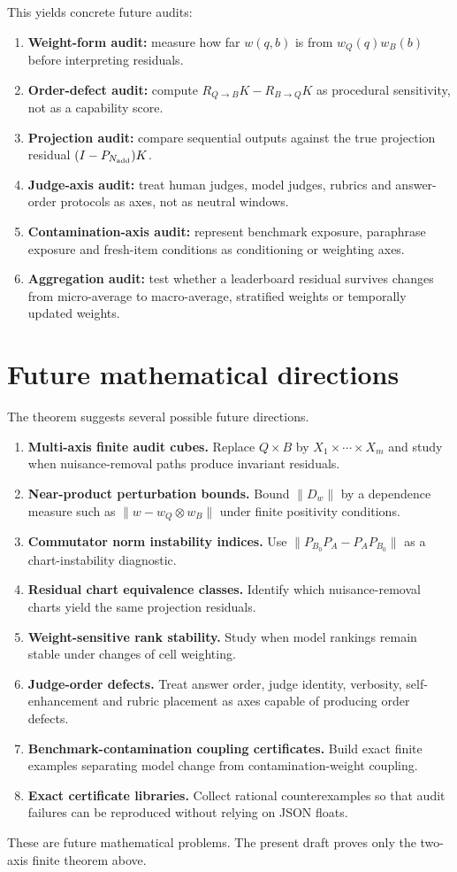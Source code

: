 \documentclass[11pt]{article}
\theoremstyle{remark}
\newcommand{\RQBt}{R_{Q\to B}}
\newcommand{\RBQt}{R_{B\to Q}}
\begin{document}
This yields concrete future audits:
\begin{enumerate}[leftmargin=*,itemsep=2pt]
\item \textbf{Weight-form audit:} measure how far $w(q,b)$ is from $w_Q(q)w_B(b)$ before interpreting residuals.
\item \textbf{Order-defect audit:} compute $\RQBt K-\RBQt K$ as procedural sensitivity, not as a capability score.
\item \textbf{Projection audit:} compare sequential outputs against the true projection residual $(I-P_{N_{\rm add}})K$.
\item \textbf{Judge-axis audit:} treat human judges, model judges, rubrics and answer-order protocols as axes, not as neutral windows.
\item \textbf{Contamination-axis audit:} represent benchmark exposure, paraphrase exposure and fresh-item conditions as conditioning or weighting axes.
\item \textbf{Aggregation audit:} test whether a leaderboard residual survives changes from micro-average to macro-average, stratified weights or temporally updated weights.
\end{enumerate}

\section{Future mathematical directions}

The theorem suggests several possible future directions.
\begin{enumerate}[leftmargin=*,itemsep=2pt]
\item \textbf{Multi-axis finite audit cubes.} Replace $Q\times B$ by $X_1\times\cdots\times X_m$ and study when nuisance-removal paths produce invariant residuals.
\item \textbf{Near-product perturbation bounds.} Bound $\|D_w\|$ by a dependence measure such as $\|w-w_Q\otimes w_B\|$ under finite positivity conditions.
\item \textbf{Commutator norm instability indices.} Use $\|P_{B_0}P_A-P_AP_{B_0}\|$ as a chart-instability diagnostic.
\item \textbf{Residual chart equivalence classes.} Identify which nuisance-removal charts yield the same projection residuals.
\item \textbf{Weight-sensitive rank stability.} Study when model rankings remain stable under changes of cell weighting.
\item \textbf{Judge-order defects.} Treat answer order, judge identity, verbosity, self-enhancement and rubric placement as axes capable of producing order defects.
\item \textbf{Benchmark-contamination coupling certificates.} Build exact finite examples separating model change from contamination-weight coupling.
\item \textbf{Exact certificate libraries.} Collect rational counterexamples so that audit failures can be reproduced without relying on JSON floats.
\end{enumerate}
These are future mathematical problems. The present draft proves only the two-axis finite theorem above.
\end{document}
